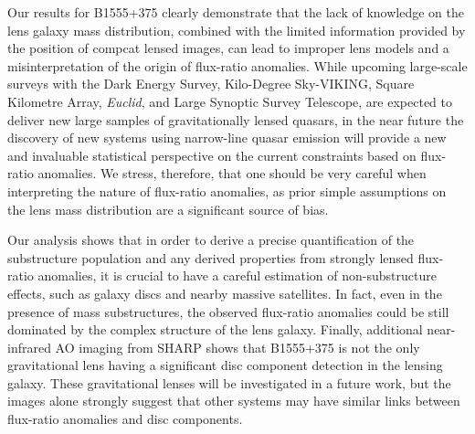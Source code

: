 \documentclass[a4paper,fleqn,usenatbib,useAMS]{mnras}
\begin{document}


 
Our results for B1555+375 clearly demonstrate that the lack of knowledge on the lens galaxy mass distribution, combined with the limited information provided by the position of compcat lensed images, can lead to improper lens models and a misinterpretation of the origin of flux-ratio anomalies. While upcoming large-scale surveys with the Dark Energy Survey, Kilo-Degree Sky-VIKING, Square Kilometre Array, {\it Euclid}, and Large Synoptic Survey Telescope, are expected to deliver new large samples of gravitationally lensed quasars, in the near future the discovery of new systems using narrow-line quasar emission \citep{N14} will provide a new and invaluable statistical perspective on the current constraints based on flux-ratio anomalies. We stress, therefore, that one should be very careful when interpreting the nature of flux-ratio anomalies, as prior simple assumptions on the lens mass distribution are a significant source of bias. 

Our analysis shows that in order to derive a precise quantification of the substructure population and any derived properties from strongly lensed flux-ratio anomalies, it is crucial to have a careful estimation of non-substructure effects, such as galaxy discs and nearby massive satellites. In fact, even in the presence of mass substructures, the observed flux-ratio anomalies could be still dominated by the complex structure of the lens galaxy. Finally, additional near-infrared AO imaging from SHARP shows that B1555+375 is not the only gravitational lens having a significant disc component detection in the lensing galaxy.  These gravitational lenses will be investigated in a future work, but the images alone strongly suggest that other systems may have similar links between flux-ratio anomalies and disc components.
\end{document}

